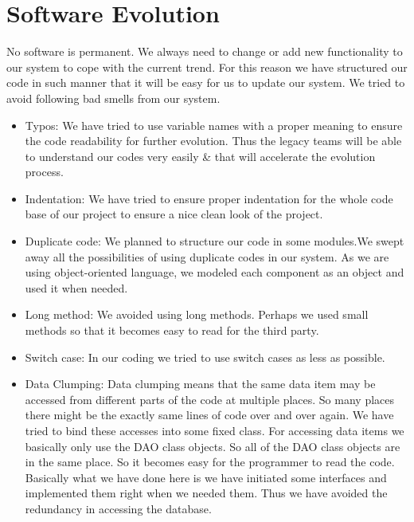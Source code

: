 \documentclass{scrreprt}
\begin{document}
\chapter{Software Evolution}
No software is permanent. We always need to change or add new functionality to our system to cope with the current trend. For this reason we have structured our code in such manner that it will be easy for us to update our system. We tried to avoid following bad smells from our system.
\begin{itemize}
\item{Typos:} We have tried to use variable names with a proper meaning to ensure the code readability for further evolution. Thus the legacy teams will be able to understand our codes very easily \& that will accelerate the evolution process.
\item{Indentation:} We have tried to ensure proper indentation for the whole code base of our project to ensure a nice clean look of the project.
\item{Duplicate code:} We planned to structure our code in some modules.We swept away all the possibilities of using duplicate codes in our system. As we are using object-oriented language, we modeled each component as an object and used it when needed.
\item{Long method:} We avoided using long methods. Perhaps we used small methods so that it becomes easy to read for the third party.
\item{Switch case:} In our coding we tried to use switch cases as less as possible.
\item{Data Clumping:} Data clumping means that the same data item may be
accessed from different parts of the code at multiple places. So many places
there might be the exactly same lines of code over and over again. We have
tried to bind these accesses into some fixed class. For accessing data items
we basically only use the DAO class objects. So all of the DAO class objects
are in the same place. So it becomes easy for the programmer to read the
code. Basically what we have done here is we have initiated some interfaces and implemented them right when we needed them. Thus we have avoided the redundancy in accessing the database.
\end{itemize}
\end{document}
